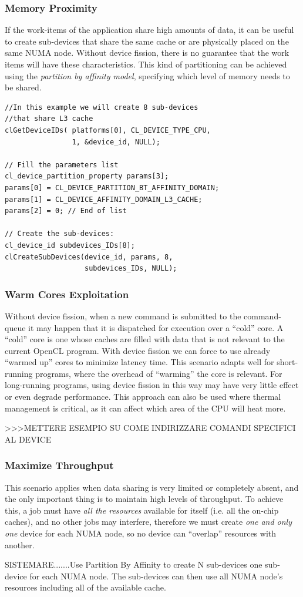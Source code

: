 \subsubsection{Memory Proximity}
If the work-items of the application share high amounts of data, it can be useful to create sub-devices that share the same cache or are physically placed on the same NUMA node.
Without device fission, there is no guarantee that the work items will have these characteristics.
This kind of partitioning can be achieved using the \textit{partition by affinity model}, specifying which level of memory needs to be shared.

{\footnotesize\begin{verbatim}
//In this example we will create 8 sub-devices
//that share L3 cache
clGetDeviceIDs( platforms[0], CL_DEVICE_TYPE_CPU,
                1, &device_id, NULL);

// Fill the parameters list
cl_device_partition_property params[3];
params[0] = CL_DEVICE_PARTITION_BT_AFFINITY_DOMAIN;
params[1] = CL_DEVICE_AFFINITY_DOMAIN_L3_CACHE; 
params[2] = 0; // End of list

// Create the sub-devices:
cl_device_id subdevices_IDs[8];
clCreateSubDevices(device_id, params, 8,
                   subdevices_IDs, NULL);
\end{verbatim}}

\subsubsection{Warm Cores Exploitation}
Without device fission, when a new command is submitted to the command-queue it may happen that it is dispatched for execution over a "`cold"' core. A "`cold"' core is one whose caches are filled with data that is not relevant to the current OpenCL program. With device fission we can force to use already "`warmed up"' cores to minimize latency time.
This scenario adapts well for short-running programs, where the overhead of "`warming"' the core is relevant. For long-running programs, using device fission in this way may have very little effect or even degrade performance.
This approach can also be used where thermal management is critical, as it can affect which area of the CPU will heat more.

>>>METTERE ESEMPIO SU COME INDIRIZZARE COMANDI SPECIFICI AL DEVICE

\subsubsection{Maximize Throughput}
This scenario applies when data sharing is very limited or completely absent, and the only important thing is to maintain high levels of throughput. To achieve this, a job must have \textit{all the resources} available for itself (i.e. all the on-chip caches), and no other jobs may interfere, therefore we must create \emph{one and only one} device for each NUMA node, so no device can "`overlap"' resources with another.

SISTEMARE.......Use Partition By Affinity to create N sub-devices one sub-device for each NUMA node.
The sub-devices can then use all NUMA node's resources including all of the available cache.






